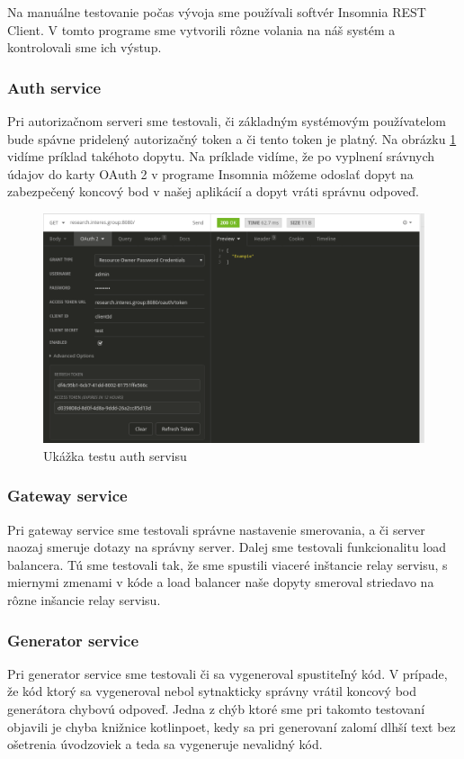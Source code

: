 Na manuálne testovanie počas vývoja sme používali softvér Insomnia REST Client\cite{insomnia}. V tomto programe sme vytvorili rôzne volania na náš systém a kontrolovali sme ich výstup.

\subsubsection{Auth service}
Pri autorizačnom serveri sme testovali, či základným systémovým používatelom bude spávne pridelený autorizačný token a či tento token je platný. Na obrázku \ref{insomnia_oauth} vidíme príklad takéhoto dopytu. Na príklade vidíme, že po vyplnení srávnych údajov do karty OAuth 2 v programe Insomnia môžeme odoslať dopyt na zabezpečený koncový bod v našej aplikácií a dopyt vráti správnu odpoveď.
\begin{figure}[!htbp] 
	\centering 
	\includegraphics[width=16cm]{img/insomnia_oauth.png} 
	\caption{Ukážka testu auth servisu} 
	\label{insomnia_oauth} 
\end{figure}

\subsubsection{Gateway service}
Pri gateway service sme testovali správne nastavenie smerovania, a či server naozaj smeruje dotazy na správny server. Dalej sme testovali funkcionalitu load balancera. Tú sme testovali tak, že sme spustili viaceré inštancie relay servisu, s miernymi zmenami v kóde a load balancer naše dopyty smeroval striedavo na rôzne inšancie relay servisu.


\subsubsection{Generator service}
Pri generator service sme testovali či sa vygeneroval spustiteľný kód. V prípade, že kód ktorý sa vygeneroval nebol sytnakticky správny vrátil koncový bod generátora chybovú odpoveď. Jedna z chýb ktoré sme pri takomto testovaní objavili je chyba knižnice kotlinpoet, kedy sa pri generovaní zalomí dlhší text bez ošetrenia úvodzoviek a teda sa vygeneruje nevalidný kód.

